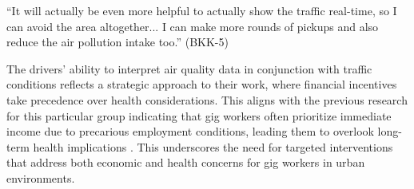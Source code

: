 \begin{quoteb}
``It will actually be even more helpful to actually show the traffic real-time, so I can avoid the area altogether...  I can make more rounds of pickups and also reduce the air pollution intake too.'' (BKK-5)
\end{quoteb}


The drivers’ ability to interpret air quality data in conjunction with traffic conditions reflects a strategic approach to their work, where financial incentives take precedence over health considerations. 
This aligns with the previous research for this particular group indicating that gig workers often prioritize immediate income due to precarious employment conditions, leading them to overlook long-term health implications \cite{tieanklin2024rideshare, zhang2022algorithmic}. 
This underscores the need for targeted interventions that address both economic and health concerns for gig workers in urban environments.